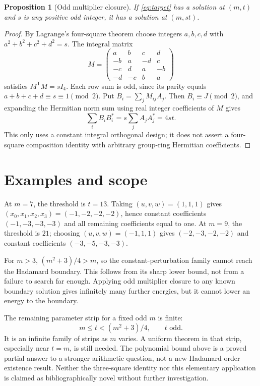 \documentclass[11pt]{article}
\newtheorem{proposition}[theorem]{Proposition}
\begin{document}
\begin{proposition}[Odd multiplier closure]\label{prop:multiplier}
If \eqref{eq:target} has a solution at $(m,t)$ and $s$ is any positive
odd integer, it has a solution at $(m,st)$.
\end{proposition}
\begin{proof}
By Lagrange's four-square theorem choose integers $a,b,c,d$ with
$a^2+b^2+c^2+d^2=s$. The integral matrix
\[
 M=\begin{pmatrix}
 a&b&c&d\\-b&a&-d&c\\-c&d&a&-b\\-d&-c&b&a
 \end{pmatrix}
\]
satisfies $M^{\mathsf T}M=sI_4$. Each row sum is odd, since its parity
equals $a+b+c+d\equiv s\equiv1\pmod2$.
Put $B_i=\sum_jM_{ij}A_j$. Then $B_i\equiv J\pmod2$, and expanding
the Hermitian norm sum using real integer coefficients of $M$ gives
\[
 \sum_i B_iB_i^*=s\sum_jA_jA_j^*=4st.
\]
This only uses a constant integral orthogonal design; it does not
assert a four-square composition identity with arbitrary group-ring
Hermitian coefficients.
\end{proof}

\section*{Examples and scope}
At $m=7$, the threshold is $t=13$. Taking $(u,v,w)=(1,1,1)$ gives
$(x_0,x_1,x_2,x_3)=(-1,-2,-2,-2)$, hence constant coefficients
$(-1,-3,-3,-3)$ and all remaining coefficients equal to one.
At $m=9$, the threshold is $21$; choosing $(u,v,w)=(-1,1,1)$ gives
$(-2,-3,-2,-2)$ and constant coefficients $(-3,-5,-3,-3)$.

For $m>3$, $(m^2+3)/4>m$, so the constant-perturbation family cannot
reach the Hadamard boundary. This follows from its sharp lower bound,
not from a failure to search far enough. Applying odd multiplier closure
to any known boundary solution gives infinitely many further energies,
but it cannot lower an energy to the boundary.

The remaining parameter strip for a fixed odd $m$ is finite:
\[
 m\le t<(m^2+3)/4,\qquad t\text{ odd}.
\]
It is an infinite family of strips as $m$ varies. A uniform theorem in
that strip, especially near $t=m$, is still needed. The polynomial
bound above is a proved partial answer to a stronger arithmetic question,
not a new Hadamard-order existence result. Neither the three-square
identity nor this elementary application is claimed as bibliographically
novel without further investigation.
\end{document}
